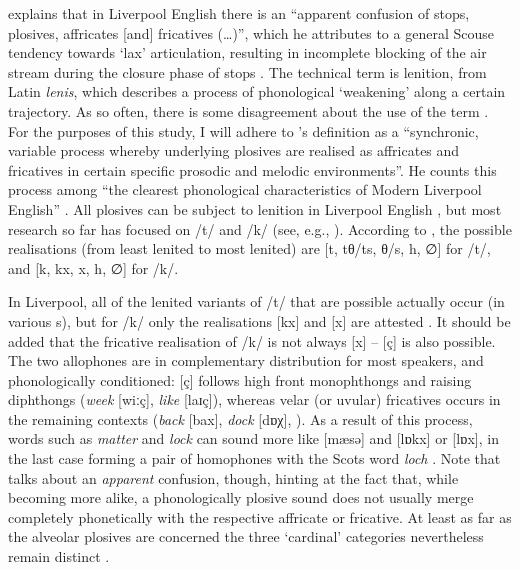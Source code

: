 \textcite[251]{knowles1973} explains that in Liverpool English there is an ``apparent confusion of stops, plosives, affricates [and] fricatives (\ldots)'', which he attributes to a general Scouse tendency towards `lax' articulation, resulting in incomplete blocking of the air stream during the closure phase of stops \parencite[cf.][107]{knowles1973}.
The technical term is lenition, from Latin \emph{lenis}, which describes a process of phonological `weakening' along a certain trajectory.
As so often, there is some disagreement about the use of the term \parencite[cf.][196]{watson2002}. For the purposes of this study, I will adhere to \citeauthor{honeybone2007}'s definition as a ``synchronic, variable process whereby underlying plosives are realised as affricates and fricatives in certain specific prosodic and melodic environments''.
He counts this process among ``the clearest phonological characteristics of Modern Liverpool English'' \citeyearpar[129]{honeybone2007}.
All plosives can be subject to lenition in Liverpool English \citep[cf.][236]{honeybone2001}, but most research so far has focused on /t/ and /k/ (see, e.g., \citealt{honeybone2001, sangster2001, watson2002, watson2006}).
According to \textcite[236]{honeybone2001}, the possible realisations (from least lenited to most lenited) are [t, tθ/ts, θ/s, h, ∅] for /t/, and [k, kx, x, h, ∅] for /k/.

In Liverpool, all of the lenited variants of /t/ that are possible actually occur (in various s), but for /k/ only the realisations [kx] and [x] are attested \parencite[cf][242]{honeybone2001}.
It should be added that the fricative realisation of /k/ is not always [x] -- [ç] is also possible.
The two allophones are in complementary distribution for most speakers, and phonologically conditioned: [ç] follows high front monophthongs and raising diphthongs (\emph{week} [wiːç], \emph{like} [laɪç]), whereas velar (or uvular) fricatives occurs in the remaining contexts (\emph{back} [bax], \emph{dock} [dɒχ], \citealp[cf.][353]{watson2007}).
As a result of this process, words such as \emph{matter} and \emph{lock} can sound more like [mæsə] and [lɒkx] or [lɒx], in the last case forming a pair of homophones with the Scots word \emph{loch} \citep[cf.][73]{trudgill1999}.
Note that \cite{knowles1973} talks about an \emph{apparent} confusion, though, hinting at the fact that, while becoming more alike, a phonologically plosive sound does not usually merge completely phonetically with the respective affricate or fricative.
At least as far as the alveolar plosives are concerned the three `cardinal' categories nevertheless remain distinct \parencite[cf.][327 and 252--253]{knowles1973}.

